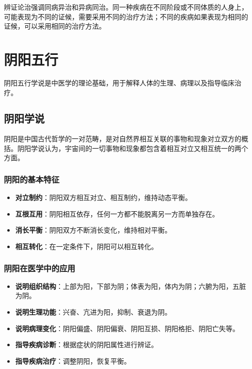 \documentclass[12pt,UTF8]{ctexbook}
\begin{document}
辨证论治强调同病异治和异病同治。同一种疾病在不同阶段或不同体质的人身上，可能表现为不同的证候，需要采用不同的治疗方法；不同的疾病如果表现为相同的证候，可以采用相同的治疗方法。

\section{阴阳五行}

阴阳五行学说是中医学的理论基础，用于解释人体的生理、病理以及指导临床治疗。

\subsection{阴阳学说}

阴阳是中国古代哲学的一对范畴，是对自然界相互关联的事物和现象对立双方的概括。阴阳学说认为，宇宙间的一切事物和现象都包含着相互对立又相互统一的两个方面。

\subsubsection{阴阳的基本特征}

\begin{itemize}
\item \textbf{对立制约}：阴阳双方相互对立、相互制约，维持动态平衡。
\item \textbf{互根互用}：阴阳相互依存，任何一方都不能脱离另一方而单独存在。
\item \textbf{消长平衡}：阴阳双方不断消长变化，维持相对平衡。
\item \textbf{相互转化}：在一定条件下，阴阳可以相互转化。
\end{itemize}

\subsubsection{阴阳在医学中的应用}

\begin{itemize}
\item \textbf{说明组织结构}：上部为阳，下部为阴；体表为阳，体内为阴；六腑为阳，五脏为阴。
\item \textbf{说明生理功能}：兴奋、亢进为阳，抑制、衰退为阴。
\item \textbf{说明病理变化}：阴阳偏盛、阴阳偏衰、阴阳互损、阴阳格拒、阴阳亡失等。
\item \textbf{指导疾病诊断}：根据症状的阴阳属性进行辨证。
\item \textbf{指导疾病治疗}：调整阴阳，恢复平衡。
\end{itemize}
\end{document}
